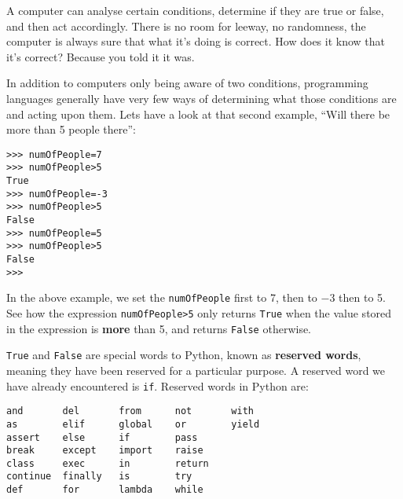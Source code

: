  A computer can analyse certain conditions, determine if they are true or false, and then act accordingly. There is no room for leeway, no randomness, the computer is always sure that what it's doing is correct. How does it know that it's correct? Because you told it it was.

In addition to computers only being aware of two conditions,   programming languages generally have very few ways of determining what   those conditions are and acting upon them. Lets have a look at that second example, ``Will there be more than 5 people there'':


\begin{lstlisting}
>>> numOfPeople=7
>>> numOfPeople>5
True
>>> numOfPeople=-3
>>> numOfPeople>5
False
>>> numOfPeople=5
>>> numOfPeople>5
False
>>> 

		\end{lstlisting}

In the above example, we set the \texttt{numOfPeople} first to 7, then to $-3$ then to 5. See how the expression 
\texttt{numOfPeople>5} only returns 
\texttt{True} when the value stored in the expression is \textbf{more} than 5, and returns 
\texttt{False} otherwise.    

\texttt{True} and \texttt{False} are special words to Python, known as   \textbf{reserved words}, meaning they have been reserved for a   particular purpose. A reserved word we have already encountered is   \texttt{if}. Reserved words in Python are:
{\bfseries\begin{lstlisting}
and       del       from      not       with
as        elif      global    or        yield
assert    else      if        pass      
break     except    import    raise
class     exec      in        return
continue  finally   is        try
def       for       lambda    while
                \end{lstlisting}}

